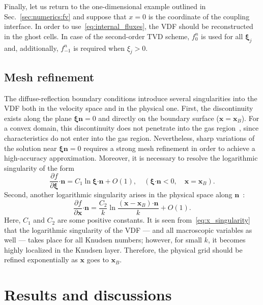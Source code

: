 \documentclass{elsarticle} %
\newcommand{\pder}[2][]{\frac{\partial#1}{\partial#2}}
\newcommand{\OO}[1]{O(#1)}
\newcommand{\bxi}{\boldsymbol{\xi}}
\newcommand{\bn}{\boldsymbol{n}}
\newcommand{\bdot}{\boldsymbol{\cdot}}
\newcommand{\bx}{\boldsymbol{x}}
\begin{document}
Finally, let us return to the one-dimensional example outlined in Sec.~\ref{sec:numerics:fv}
and suppose that \(x=0\) is the coordinate of the coupling interface.
In order to use~\eqref{eq:internal_fluxes}, the VDF should be reconstructed in the ghost cells.
In case of the second-order TVD scheme, \(f^n_0\) is used for all \(\bxi_j\) and, additionally,
\(f^n_{-1}\) is required when \(\xi_j>0\).


\subsection{Mesh refinement}\label{sec:numerics:refinement}

The diffuse-reflection boundary conditions introduce several singularities into the VDF
both in the velocity space and in the physical one.
First, the discontinuity exists along the plane \(\bxi\bn=0\) and directly on the boundary surface (\(\bx=\bx_B\)).
For a convex domain, this discontinuity does not penetrate into the gas region~\cite{Kim2011, Guo2017},
since characteristics do not enter into the gas region.
Nevertheless, sharp variations of the solution near \(\bxi\bn=0\) requires a strong mesh refinement
in order to achieve a high-accuracy approximation.
Moreover, it is necessary to resolve the logarithmic singularity of the form~\cite{Takata2016}
\begin{equation}\label{eq:xi_singularity}
    \pder[f]{\bxi}\bdot\bn = C_1\ln\bxi\bdot\bn + \OO{1}, \quad (\bxi\bdot\bn<0, \quad \bx=\bx_B).
\end{equation}
Second, another logarithmic singularity arises in the physical space along \(\bn\)~\cite{Takata2014}:
\begin{equation}\label{eq:x_singularity}
    \pder[f]{\bx}\bdot\bn = \frac{C_2}{k}\ln\frac{(\bx-\bx_B)\bdot\bn}{k} + \OO{1}.
\end{equation}
Here, \(C_1\) and \(C_2\) are some positive constants.
It is seen from~\eqref{eq:x_singularity} that the logarithmic singularity of the VDF
--- and all macroscopic variables as well --- takes place for all Knudsen numbers;
however, for small \(k\), it becomes highly localized in the Knudsen layer.
Therefore, the physical grid should be refined exponentially as \(\bx\) goes to \(\bx_B\).

\section{Results and discussions}\label{sec:results}
\end{document}
